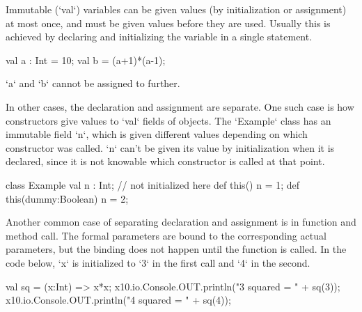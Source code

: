 Immutable (\xcd`val`) variables can be given values (by initialization or assignment) at
most once, and must be given values before they are used.  Usually this is
achieved by declaring and initializing the variable in a single statement.
\begin{xten}
val a : Int = 10;
val b = (a+1)*(a-1);
\end{xten}
\xcd`a` and \xcd`b` cannot be assigned to further.

In other cases, the declaration and assignment are separate.  One such
case is how constructors give values to \xcd`val` fields of objects.  The
\xcd`Example` class has an immutable field \xcd`n`, which is given different
values depending on which constructor was called. \xcd`n` can't be given its
value by initialization when it is declared, since it is not knowable which
constructor is called at that point.  
\begin{xten}
class Example {
  val n : Int; // not initialized here
  def this() { n = 1; }
  def this(dummy:Boolean) { n = 2;}
}
\end{xten}
%

Another common case of separating declaration and assignment is in function
and method call.  The formal parameters are bound to the corresponding actual
parameters, but the binding does not happen until the function is called.  In
the code below, \xcd`x` is initialized to \xcd`3` in the first call and
\xcd`4` in the second.
\begin{xten}
val sq = (x:Int) => x*x;
x10.io.Console.OUT.println("3 squared = " + sq(3));
x10.io.Console.OUT.println("4 squared = " + sq(4));
\end{xten}






